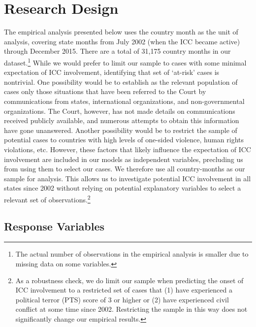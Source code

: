 \section*{Research Design}

The empirical analysis presented below uses the country month as the unit of analysis, covering state months from July 2002 (when the ICC became active) through December 2015. There are a total of 31,175 country months in our dataset.\footnote{The actual number of observations in the empirical analysis is smaller due to missing data on some variables.} While we would prefer to limit our sample to cases with some minimal expectation of ICC involvement, identifying that set of ‘at-risk’ cases is nontrivial.  One possibility would be to establish as the relevant population of cases only those situations that have been referred to the Court by communications from states, international organizations, and non-governmental organizations. The Court, however, has not made details on communications received publicly available, and numerous attempts to obtain this information have gone unanswered. Another possibility would be to restrict the sample of potential cases to countries with high levels of one-sided violence, human rights violations, etc.  However, these factors that likely influence the expectation of ICC involvement are included in our models as independent variables, precluding us from using them to select our cases. We therefore use all country-months as our sample for analysis. This allows us to investigate potential ICC involvement in all states since 2002 without relying on potential explanatory variables to select a relevant set of observations.\footnote{As a robustness check, we do limit our sample when predicting the onset of ICC involvement to a restricted set of cases that (1) have experienced a political terror (PTS) score of 3 or higher or (2) have experienced civil conflict at some time since 2002.  Restricting the sample in this way does not significantly change our empirical results.}

\subsection*{Response Variables}


